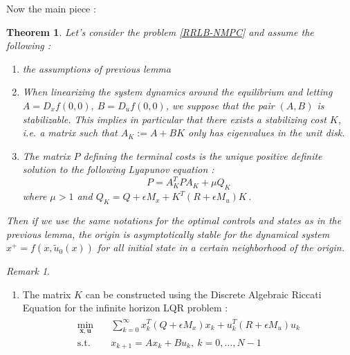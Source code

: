 \documentclass[12pt]{article}
\newtheorem{theorem}{Theorem}[section]
\theoremstyle{definition}
\theoremstyle{remark}
\newtheorem*{remark}{Remark}
\begin{document}
Now the main piece :

\begin{theorem}\label{nominal-stability}
	Let's consider the problem \ref{RRLB-NMPC} and assume the following :
	\begin{enumerate}
		\item the assumptions of previous lemma
		\item When linearizing the system dynamics around the equilibrium and letting $A=D_xf(0,0),~B=D_uf(0,0)$, we suppose that the pair $(A,B)$ is stabilizable.
		This implies in particular that there exists a stabilizing cost $K$, i.e. a matrix such that $A_K:=A+BK$ only has eigenvalues in the unit disk.
		\item The matrix $P$ defining the terminal costs is the unique positive definite solution to the following Lyapunov equation :
		\begin{equation*}
			P=A_K^TPA_K+\mu Q_K
		\end{equation*}
		where $\mu>1$ and $Q_K=Q+\epsilon M_x+K^T(R+\epsilon M_u)K$\,.
	\end{enumerate}	
	Then if we use the same notations for the optimal controls and states as in the previous lemma, the origin is asymptotically stable for the dynamical system $x^+=f(x,\tilde{u}_0(x))$ for all initial state in a certain neighborhood of the origin.
\end{theorem}

\begin{remark}
	\begin{enumerate}
		\item The matrix $K$ can be constructed using the Discrete Algebraic Riccati Equation for the infinite horizon LQR problem :
		\begin{align}
			\begin{split}\label{inf-LQR}
				\underset{\mathbf{x},\mathbf{u}}{\min} &\quad \sum_{k=0}^\infty x_k^T(Q+\epsilon M_x)x_k+u_k^T(R+\epsilon M_u)u_k\\
				\text{s.t.} &\quad x_{k+1}=Ax_k+Bu_k,~k=0,\dots,N-1\\
			\end{split}
		\end{align}
	\end{enumerate}
\end{remark}
\end{document}
